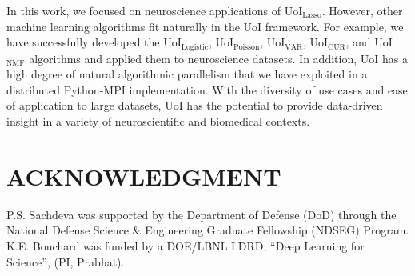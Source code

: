 \documentclass[letterpaper, 10 pt, conference]{ieeeconf}  %
\begin{document}
In this work, we focused on neuroscience applications of UoI$_{\text{Lasso}}$. However, other machine learning algorithms fit naturally in the UoI framework. For example, we have successfully developed  the UoI$_{\text{Logistic}}$, UoI$_{\text{Poisson}}$, UoI$_{\text{VAR}}$, UoI$_{\text{CUR}}$, and UoI$_{\text{NMF}}$ algorithms and applied them to neuroscience datasets. In addition, UoI has a high degree of natural algorithmic parallelism that we have exploited in a distributed Python-MPI implementation. With the diversity of use cases and ease of application to large datasets, UoI has the potential to provide data-driven insight in a variety of neuroscientific and biomedical contexts.

\addtolength{\textheight}{-12cm}   %








\section*{ACKNOWLEDGMENT}

P.S. Sachdeva was supported by the Department of Defense (DoD) through the National Defense Science \& Engineering Graduate Fellowship (NDSEG) Program. K.E. Bouchard was funded by a DOE/LBNL LDRD, ``Deep Learning for Science'', (PI, Prabhat).


\end{document}
